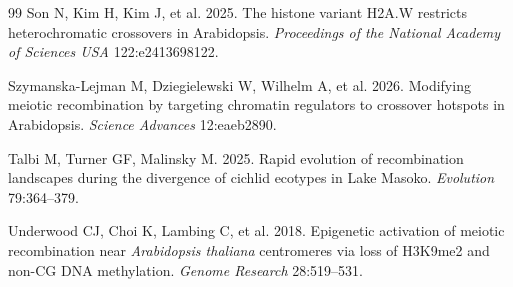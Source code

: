 \documentclass[11pt]{article}
\theoremstyle{remark}
\begin{document}
\begin{thebibliography}{99}
Son N, Kim H, Kim J, et al. 2025. The histone variant H2A.W restricts
heterochromatic crossovers in Arabidopsis. \emph{Proceedings of the National
Academy of Sciences USA} 122:e2413698122.

Szymanska-Lejman M, Dziegielewski W, Wilhelm A, et al. 2026. Modifying meiotic
recombination by targeting chromatin regulators to crossover hotspots in
Arabidopsis. \emph{Science Advances} 12:eaeb2890.

Talbi M, Turner GF, Malinsky M. 2025. Rapid evolution of recombination landscapes
during the divergence of cichlid ecotypes in Lake Masoko. \emph{Evolution}
79:364--379.

Underwood CJ, Choi K, Lambing C, et al. 2018. Epigenetic activation of meiotic
recombination near \emph{Arabidopsis thaliana} centromeres via loss of H3K9me2 and
non-CG DNA methylation. \emph{Genome Research} 28:519--531.

\end{thebibliography}
\end{document}
